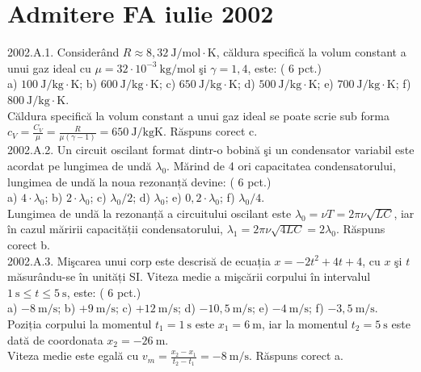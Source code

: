 \section{Admitere FA iulie 2002}

2002.A.1. Considerând $R \approx 8,32 \mathrm{~J} / \mathrm{mol} \cdot \mathrm{K}$, căldura specifică la volum constant a unui gaz ideal cu $\mu=32 \cdot 10^{-3} \mathrm{~kg} / \mathrm{mol}$ şi $\gamma=1,4$, este: ( 6 pct.)\\ a) $100 \mathrm{~J} / \mathrm{kg} \cdot \mathrm{K}$; b) $600 \mathrm{~J} / \mathrm{kg} \cdot \mathrm{K}$; c) $650 \mathrm{~J} / \mathrm{kg} \cdot \mathrm{K}$; d) $500 \mathrm{~J} / \mathrm{kg} \cdot \mathrm{K}$; e) $700 \mathrm{~J} / \mathrm{kg} \cdot \mathrm{K}$; f) $800 \mathrm{~J} / \mathrm{kg} \cdot \mathrm{K}$.\\ Căldura specifică la volum constant a unui gaz ideal se poate scrie sub forma $c_{V}=\frac{C_{V}}{\mu}=\frac{R}{\mu(\gamma-1)}=650 \mathrm{~J} / \mathrm{kgK}$. Răspuns corect c.\\

2002.A.2. Un circuit oscilant format dintr-o bobină şi un condensator variabil este acordat pe lungimea de undă $\lambda_{0}$. Mărind de 4 ori capacitatea condensatorului, lungimea de undă la noua rezonanță devine: ( 6 pct.)\\ a) $4 \cdot \lambda_{0}$; b) $2 \cdot \lambda_{0}$; c) $\lambda_{0} / 2$; d) $\lambda_{0}$; e) $0,2 \cdot \lambda_{0}$; f) $\lambda_{0} / 4$.\\ Lungimea de undă la rezonanță a circuitului oscilant este $\lambda_{0}=\nu T=2 \pi \nu \sqrt{L C}$, iar în cazul măririi capacității condensatorului, $\lambda_{1}=2 \pi \nu \sqrt{4 L C}=2 \lambda_{0}$. Răspuns corect b.\\

2002.A.3. Mişcarea unui corp este descrisă de ecuația $x=-2 t^{2}+4 t+4$, cu $x$ şi $t$ măsurându-se în unități SI. Viteza medie a mişcării corpului în intervalul $1 \mathrm{~s} \leq t \leq 5 \mathrm{~s}$, este: ( 6 pct.)\\ a) $-8 \mathrm{~m} / \mathrm{s}$; b) $+9 \mathrm{~m} / \mathrm{s}$; c) $+12 \mathrm{~m} / \mathrm{s}$; d) $-10,5 \mathrm{~m} / \mathrm{s}$; e) $-4 \mathrm{~m} / \mathrm{s}$; f) $-3,5 \mathrm{~m} / \mathrm{s}$.\\ Poziția corpului la momentul $t_{1}=1 \mathrm{~s}$ este $x_{1}=6 \mathrm{~m}$, iar la momentul $t_{2}=5 \mathrm{~s}$ este dată de coordonata $x_{2}=-26 \mathrm{~m}$.\\ Viteza medie este egală cu $v_{m}=\frac{x_{2}-x_{1}}{t_{2}-t_{1}}=-8 \mathrm{~m} / \mathrm{s}$. Răspuns corect a.\\

